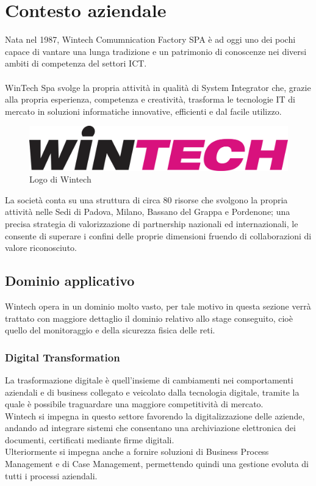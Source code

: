 \documentclass[Tesi.tex]{subfiles}
\begin{document}
\setcounter{chapter}{0}
\chapter{Contesto aziendale}

Nata nel 1987, Wintech Comumnication Factory SPA è ad oggi uno dei pochi  capace di vantare una lunga tradizione e un patrimonio di conoscenze nei diversi ambiti di competenza del settori ICT. \\\\
WinTech Spa svolge la propria attività in qualità di System Integrator che, grazie alla propria esperienza, competenza e creatività, trasforma le tecnologie IT di mercato in soluzioni informatiche innovative, efficienti e dal facile utilizzo.\\
\begin{figure}[H]
	\centering
	\includegraphics[width=0.9\linewidth]{"images/LogoWintech"}
	\caption{Logo di Wintech}
	\label{fig:Logo di Wintech}
\end{figure}

La società conta su una struttura di circa 80 risorse che svolgono la propria attività nelle Sedi di Padova, Milano, Bassano del Grappa e Pordenone; una precisa strategia di valorizzazione di partnership nazionali ed internazionali, le consente di superare i confini delle proprie dimensioni fruendo di collaborazioni di valore riconosciuto.\\

\newpage
\section{Dominio applicativo}
Wintech opera in un dominio molto vasto, per tale motivo in questa sezione verrà trattato con maggiore dettaglio il dominio relativo allo stage conseguito, cioè quello del monitoraggio e della sicurezza fisica delle reti. \\

\subsection{Digital Transformation}
La trasformazione digitale è quell'insieme di cambiamenti nei comportamenti aziendali e di business collegato e veicolato dalla tecnologia digitale, tramite la quale è possibile traguardare una maggiore competitività di mercato. \\
Wintech si impegna in questo settore favorendo la digitalizzazione delle aziende, andando ad integrare sistemi che consentano una archiviazione elettronica dei documenti, certificati mediante firme digitali. \\
Ulteriormente si impegna anche a fornire soluzioni di Business Process Management e di Case Management, permettendo quindi una gestione evoluta di tutti i processi aziendali.
\end{document}
